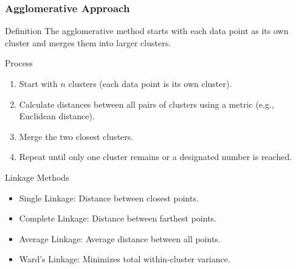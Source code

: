 \documentclass{beamer}
\begin{document}
\begin{frame}[fragile]
    \frametitle{Agglomerative Approach}
    \begin{block}{Definition}
        The agglomerative method starts with each data point as its own cluster and merges them into larger clusters.
    \end{block}
    
    \begin{block}{Process}
        \begin{enumerate}
            \item Start with \( n \) clusters (each data point is its own cluster).
            \item Calculate distances between all pairs of clusters using a metric (e.g., Euclidean distance).
            \item Merge the two closest clusters.
            \item Repeat until only one cluster remains or a designated number is reached.
        \end{enumerate}
    \end{block}

    \begin{block}{Linkage Methods}
        \begin{itemize}
            \item Single Linkage: Distance between closest points.
            \item Complete Linkage: Distance between farthest points.
            \item Average Linkage: Average distance between all points.
            \item Ward's Linkage: Minimizes total within-cluster variance.
        \end{itemize}
    \end{block}
\end{frame}
\end{document}

